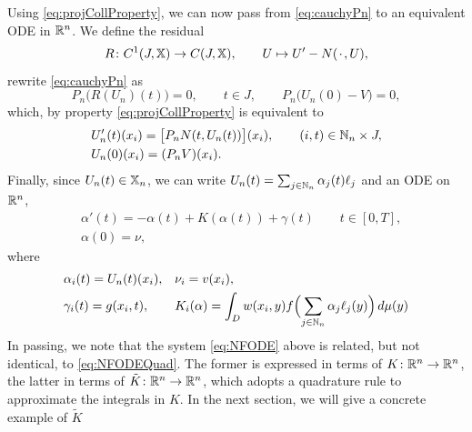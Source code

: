 \documentclass[a4paper]{siamart190516}
\begin{document}
Using \cref{eq:projCollProperty}, we can now pass from \cref{eq:cauchyPn} to an
equivalent ODE in $\mathbb{R}^n$. We define the residual
\[
  R \colon C^1(J,\mathbb{X}) \to C(J,\mathbb{X}), \qquad U \mapsto U' - N({\mkern 2mu\cdot\mkern 2mu}, U),
\]
rewrite \cref{eq:cauchyPn} as
\[
  P_n \bigl( R(U_n)(t) \bigr) = 0, \qquad t \in J, \qquad 
  P_n \bigl( U_n(0) - V\bigr) = 0, 
\]
which, by property \cref{eq:projCollProperty} is equivalent to
\[
  \begin{aligned}
  & U'_n(t)(x_i) = \bigl[P_n N(t,U_n(t))\bigr](x_i), \qquad (i,t) \in \mathbb{N}_n \times J, \\
  & U_n(0)(x_i) = (P_n V)(x_i).
  \end{aligned}
\]
Finally, since $U_n(t) \in \mathbb{X}_n$, we can write $U_n(t) = \sum_{j \in \mathbb{N}_n}
\alpha_j(t) \ell_j$ and an ODE on $\mathbb{R}^n$,
\begin{equation} \label{eq:NFODE}
  \begin{aligned}
   & \alpha'(t) = -\alpha(t) + K(\alpha(t)) + \gamma(t) \qquad  t \in [0,T],\\ 
   & \alpha (0) = \nu,
  \end{aligned}
\end{equation}  
where 
\[
  \begin{aligned}
  & \alpha_i(t) = U_n(t)(x_i), && \nu_i = v(x_i),  \\
  & \gamma_i(t) = g(x_i,t),
  && K_i(\alpha) = 
    \int_{D}w(x_i,y) f\Bigl( \sum_{j \in \mathbb{N}_n} \alpha_j \ell_j(y)\Bigr) \, d\mu(y)
  \end{aligned}
\]
In passing, we note that the system \cref{eq:NFODE} above is related, but not
identical, to \cref{eq:NFODEQuad}. The former is expressed in terms of 
$K \colon \mathbb{R}^n \to \mathbb{R}^n$, the latter in terms of
$\tilde K \colon \mathbb{R}^n \to \mathbb{R}^n$, which adopts a quadrature rule to approximate
the integrals in $K$. In the next section, we will give a concrete example of $\tilde
K$
\end{document}
